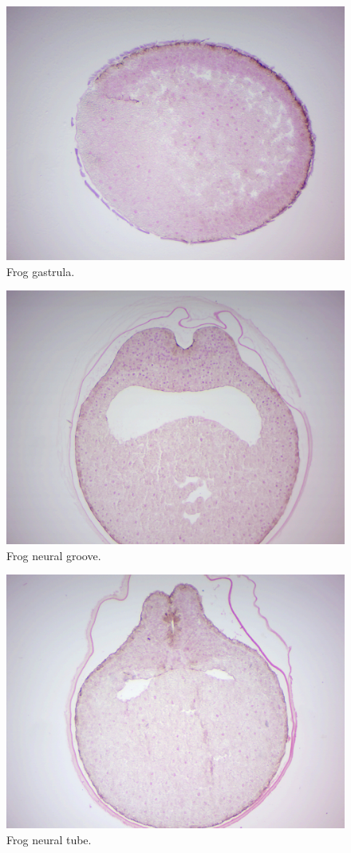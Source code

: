 \begin{figure}

{\centering \includegraphics[width=0.7\linewidth]{./figures/development/frog_gastrula}

}

\caption{Frog gastrula.}\label{fig:gastrula}
\end{figure}

\begin{figure}

{\centering \includegraphics[width=0.7\linewidth]{./figures/development/frog_neural_groove}

}

\caption{Frog neural groove.}\label{fig:groove}
\end{figure}

\begin{figure}

{\centering \includegraphics[width=0.7\linewidth]{./figures/development/frog_neural_tube}

}

\caption{Frog neural tube.}\label{fig:tube}
\end{figure}

